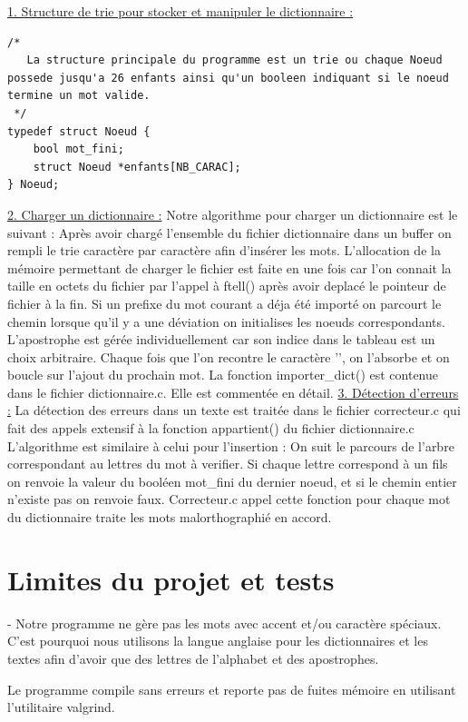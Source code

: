 \documentclass[12pt]{article}
\begin{document}
\newline
\noindent
\underline{1. Structure de trie pour stocker et manipuler le dictionnaire :}
\noindent
\begin{lstlisting}[style=CStyle]
/*
   La structure principale du programme est un trie ou chaque Noeud possede jusqu'a 26 enfants ainsi qu'un booleen indiquant si le noeud termine un mot valide.
 */
typedef struct Noeud {
    bool mot_fini;
    struct Noeud *enfants[NB_CARAC];
} Noeud;
\end{lstlisting}
\newline
\newline 
\underline{2. Charger un dictionnaire  :}
\newline 
\noindent
Notre algorithme pour charger un dictionnaire est le suivant :
Après avoir chargé l'ensemble du fichier dictionnaire dans un buffer on rempli le trie caractère par caractère afin d'insérer les mots.
L'allocation de la mémoire permettant de charger le fichier est faite en une fois car l'on connait la taille en octets du fichier par l'appel à ftell() après avoir deplacé le pointeur de fichier à la fin.
Si un prefixe du mot courant a déja été importé on parcourt le chemin lorsque qu'il y a une déviation on initialises les noeuds correspondants.
L'apostrophe est gérée individuellement car son indice dans le tableau est un choix arbitraire.
Chaque fois que l'on recontre le caractère '\n', on l'absorbe et on boucle sur l'ajout du prochain mot.
\newline 
\noindent
La fonction importer\_dict() est contenue dans le fichier dictionnaire.c. Elle est commentée en détail.
\newline
\noindent
\underline{3. Détection d'erreurs :}
\newline
La détection des erreurs dans un texte est traitée dans le fichier correcteur.c qui fait des appels extensif à la fonction appartient() du fichier dictionnaire.c
L'algorithme est similaire à celui pour l'insertion :
On suit le parcours de l'arbre correspondant  au lettres du mot à verifier. Si chaque lettre correspond à un fils on renvoie la valeur du booléen mot\_fini du dernier noeud, et si le chemin entier n'existe pas on renvoie faux. Correcteur.c appel cette fonction pour chaque mot du dictionnaire traite les mots malorthographié en accord.


\section{Limites du projet et tests}
\newline
- Notre programme ne gère pas les mots avec accent et/ou caractère spéciaux. C'est pourquoi nous utilisons la langue anglaise pour les dictionnaires et les textes afin d'avoir que des lettres de l'alphabet et des apostrophes.

Le programme compile sans erreurs et reporte pas de fuites mémoire en utilisant l'utilitaire valgrind.
\end{document}

